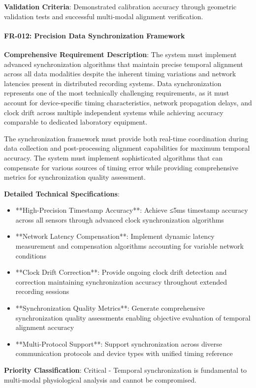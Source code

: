 \documentclass[11pt,a4paper]{report}
\begin{document}
\textbf{Validation Criteria}: Demonstrated calibration accuracy through geometric validation tests and successful multi-modal
alignment verification.

\paragraph{FR-012: Precision Data Synchronization Framework}

\textbf{Comprehensive Requirement Description}: The system must implement advanced synchronization algorithms that maintain
precise temporal alignment across all data modalities despite the inherent timing variations and network latencies
present in distributed recording systems. Data synchronization represents one of the most technically challenging
requirements, as it must account for device-specific timing characteristics, network propagation delays, and clock drift
across multiple independent systems while achieving accuracy comparable to dedicated laboratory equipment.

The synchronization framework must provide both real-time coordination during data collection and post-processing
alignment capabilities for maximum temporal accuracy. The system must implement sophisticated algorithms that can
compensate for various sources of timing error while providing comprehensive metrics for synchronization quality
assessment.

\textbf{Detailed Technical Specifications}:

\begin{itemize}
\item **High-Precision Timestamp Accuracy**: Achieve ≤5ms timestamp accuracy across all sensors through advanced clock
  synchronization algorithms
\item **Network Latency Compensation**: Implement dynamic latency measurement and compensation algorithms accounting for
  variable network conditions
\item **Clock Drift Correction**: Provide ongoing clock drift detection and correction maintaining synchronization accuracy
  throughout extended recording sessions
\item **Synchronization Quality Metrics**: Generate comprehensive synchronization quality assessments enabling objective
  evaluation of temporal alignment accuracy
\item **Multi-Protocol Support**: Support synchronization across diverse communication protocols and device types with
  unified timing reference

\end{itemize}
\textbf{Priority Classification}: Critical - Temporal synchronization is fundamental to multi-modal physiological analysis
and cannot be compromised.
\end{document}

